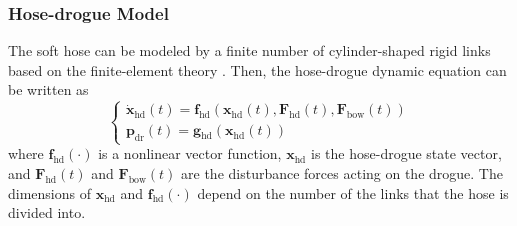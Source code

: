 \subsubsection{Hose-drogue Model}

The soft hose can be modeled by a finite number of cylinder-shaped
rigid links based on the finite-element theory \cite{hose-link-model}.
Then, the hose-drogue dynamic equation can be written as
\begin{equation}
\left\{ \begin{array}{l}
{\mathbf{{\dot{x}}}}_{\text{hd}}\left(t\right)={\mathbf{f}{_{\text{hd}}}}\left({{\mathbf{x}_{\text{hd}}}\left(t\right),}\mathbf{F}_{\text{hd}}\left(t\right),\mathbf{F}_{\text{bow}}\left(t\right)\right)\\
{\mathbf{p}_{\text{dr}}}\left(t\right)={\mathbf{g}{_{\text{hd}}}}\left({\mathbf{x}_{\text{hd}}}\left(t\right)\right)
\end{array}\right.\label{Eq_hoseDorgueDyn}
\end{equation}
where ${\mathbf{f}{_{\text{hd}}}}\left(\cdot\right)$ is a nonlinear
vector function{,} $\mathbf{x}_{\text{hd}}$ is the hose-drogue
state vector, and $\mathbf{F}_{\text{hd}}\left(t\right)$ and $\mathbf{F}_{\text{bow}}\left(t\right)$
are the disturbance forces acting on the drogue. The dimensions of
$\mathbf{x}_{\text{hd}}$ and ${\mathbf{f}{_{\text{hd}}}}\left(\cdot\right)$
depend on the number of the links that the hose is divided into.

